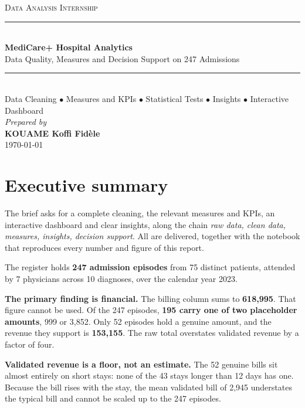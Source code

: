 \documentclass[12pt,a4paper]{article}
\begin{document}
\begin{titlepage}\centering
\singlespacing
\vspace*{3cm}
{\large\scshape Data Analysis Internship}\\[2.6cm]
\rule{\linewidth}{0.5pt}\\[0.8cm]
{\LARGE\bfseries MediCare+ Hospital Analytics}\\[0.6cm]
{\large Data Quality, Measures and Decision Support on 247 Admissions}\\[0.8cm]
\rule{\linewidth}{0.5pt}\\[1.2cm]
{\normalsize Data Cleaning $\bullet$ Measures and KPIs $\bullet$ Statistical Tests
$\bullet$ Insights $\bullet$ Interactive Dashboard}\\[3.2cm]
{\large\itshape Prepared by}\\[0.5cm]
{\Large\bfseries KOUAME Koffi Fid\`ele}\\[0.6cm]
{\large \today}
\vfill\end{titlepage}

\singlespacing
\tableofcontents\newpage
\onehalfspacing

\section{Executive summary}

The brief asks for a complete cleaning, the relevant measures and KPIs, an
interactive dashboard and clear insights, along the chain \emph{raw data, clean
data, measures, insights, decision support}. All are delivered, together with the
notebook that reproduces every number and figure of this report.

The register holds \textbf{247 admission episodes} from 75 distinct patients,
attended by 7 physicians across 10 diagnoses, over the calendar year 2023.

\textbf{The primary finding is financial.} The billing column sums to
\textbf{618{,}995}. That figure cannot be used. Of the 247 episodes,
\textbf{195 carry one of two placeholder amounts}, 999 or 3{,}852. Only 52 episodes
hold a genuine amount, and the revenue they support is \textbf{153{,}155}. The raw
total overstates validated revenue by a factor of four.

\textbf{Validated revenue is a floor, not an estimate.} The 52 genuine bills sit
almost entirely on short stays: none of the 43 stays longer than 12 days has one.
Because the bill rises with the stay, the mean validated bill of 2{,}945 understates
the typical bill and cannot be scaled up to the 247 episodes.
\end{document}
